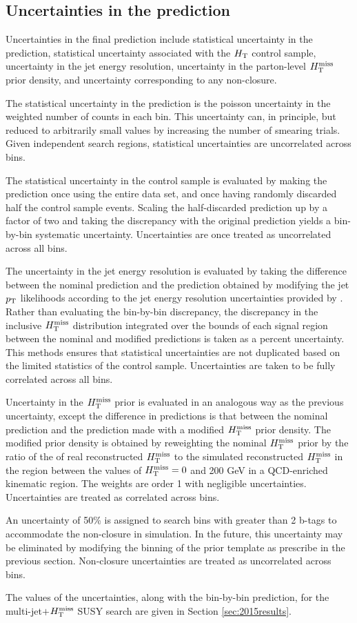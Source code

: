 \subsection{Uncertainties in the prediction}
Uncertainties in the final prediction include statistical uncertainty in the prediction, statistical uncertainty associated with the $H_{\rm T}$ control sample, uncertainty in the jet energy resolution, uncertainty in the parton-level $H_{\text{T}}^{\rm miss}$ prior density, and uncertainty corresponding to any non-closure. 

The statistical uncertainty in the prediction is the poisson uncertainty in the weighted number of counts in each bin. This uncertainty can, in principle, but reduced to arbitrarily small values by increasing the number of smearing trials. Given independent search regions, statistical uncertainties are uncorrelated across bins. 

The statistical uncertainty in the control sample is evaluated by making the prediction once using the entire data set, and once having randomly discarded half the control sample events. Scaling the half-discarded prediction up by a factor of two and taking the discrepancy with the original prediction yields a bin-by-bin systematic uncertainty. Uncertainties are once treated as uncorrelated across all bins.

The uncertainty in the jet energy resolution is evaluated by taking the difference between the nominal prediction and the prediction obtained by modifying the jet $p_{\text{T}}$ likelihoods according to the jet energy resolution uncertainties provided by  \cite{jetmet2}. Rather than evaluating the bin-by-bin discrepancy, the discrepancy in the inclusive $H_{\text{T}}^{\rm miss}$ distribution integrated over the bounds of each signal region between the nominal and modified predictions is taken as a percent uncertainty. This methods ensures that statistical uncertainties are not duplicated based on the limited statistics of the control sample. Uncertainties are taken to be fully correlated across all bins.

Uncertainty in the $H_{\text{T}}^{\rm miss}$ prior is evaluated in an analogous way as the previous uncertainty, except the difference in predictions is that between the nominal prediction and the prediction made with a modified $H_{\text{T}}^{\rm miss}$ prior density. The modified prior density is obtained by reweighting the nominal $H_{\text{T}}^{\rm miss}$ prior by the ratio of the of real reconstructed $H_{\text{T}}^{\rm miss}$ to the simulated reconstructed $H_{\text{T}}^{\rm miss}$ in the region between the values of $H_{\text{T}}^{\rm miss}=0$ and 200 GeV in a QCD-enriched kinematic region. The weights are order 1 with negligible uncertainties. Uncertainties are treated as correlated across bins.

An uncertainty of 50\% is assigned to search bins with greater than 2 b-tags to accommodate the non-closure in simulation. In the future, this uncertainty may be eliminated by modifying the binning of the prior template as prescribe in the previous section. Non-closure uncertainties are treated as uncorrelated across bins. 

The values of the uncertainties, along with the bin-by-bin prediction, for the multi-jet$+$$H_{\text{T}}^{\rm miss}$ SUSY search are given in Section \ref{sec:2015results}.

